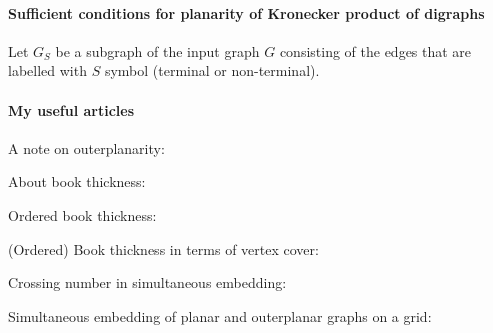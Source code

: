 \paragraph{Sufficient conditions for planarity of Kronecker product of digraphs}

Let $G_S$ be a subgraph of the input graph $G$ consisting of the edges that are labelled with $S$ symbol (terminal or non-terminal).




\paragraph{My useful articles}

A note on outerplanarity: ~\cite{jha1993note}

About book thickness: ~\cite{bernhart1979book}

Ordered book thickness: ~\cite{10.1007/978-3-030-59267-7_35}

(Ordered) Book thickness in terms of vertex cover: ~\cite{bhore2019parameterized}

Crossing number in simultaneous embedding: ~\cite{crossing2009}

Simultaneous embedding of planar and outerplanar graphs on a grid: ~\cite{brass2007simultaneous}



